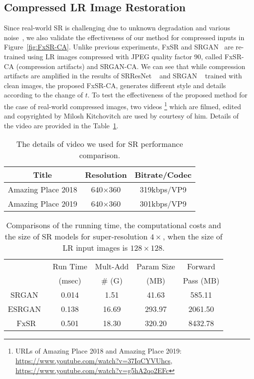 \documentclass{article}
\begin{document}
\subsection{Compressed LR Image Restoration}
Since real-world SR is challenging due to unknown degradation and various noise~\cite{zhang2020ntire, lugmayr2020ntire, nah2019ntire, hussein2020correction, ahn2020simusr, fritsche2019frequency, zhang2018learning, lugmayr2019unsupervised}, we also validate the effectiveness of our method for compressed inputs in Figure~\ref{fig:FxSR-CA}. Unlike previous experiments, FxSR and SRGAN~\cite{2017photo} are re-trained using LR images compressed with JPEG quality factor 90, called FxSR-CA (compression artifacts) and SRGAN-CA. We can see that while compression artifacts are amplified in the results of SRResNet ~\cite{2017photo} and SRGAN ~\cite{2017photo} trained with clean images, the proposed FxSR-CA, generates different style and details according to the change of $t$. To test the effectiveness of the proposed method for the case of real-world compressed images, two videos \footnote{URLs of Amazing Place 2018 and Amazing Place 2019: \url{https://www.youtube.com/watch?v=37IqCYVUhcs}, \url{https://www.youtube.com/watch?v=g5hA2qo2EFc}} which are filmed, edited and copyrighted by Milosh Kitchovitch are used by courtesy of him. Details of the video are provided in the Table~\ref{tab:comp_video}.



\begin{table}[ht]
\caption{The details of video we used for SR performance comparison.}
\begin{center}
\small
\begin{tabular}{|c|c|c|}
\hline
Title & Resolution & Bitrate/Codec \\
\hline\hline
Amazing Place 2018    & 640$\times$360	&  319kbps/VP9 \\ 
\hline
Amazing Place 2019    & 640$\times$360	&  301kbps/VP9 \\ 
\hline
\end{tabular}
\end{center}
\label{tab:comp_video}
\end{table}

\begin{table}[ht]
\caption{Comparisons of the running time, the computational costs and the size of SR models for super-resolution $4\times$, when the size of LR input images is ${128}\times{128}$.}
\begin{center}
\begin{tabular}{|c||c|c|c|c|}
\hline
{}  & Run Time  & Mult-Add & Param Size &  Forward \\
{}  & (msec)  & $\#$ (G) & (MB) &  Pass (MB)\\
\hline
\hline
{SRGAN~\cite{2017photo}} & 0.014 & 1.51 & 41.63 & 585.11\\
{ESRGAN~\cite{2018esrgan}} & 0.138 & 16.69 & 293.97 & 2061.50\\
{FxSR} & 0.501 & 18.30 & 320.20 & 8432.78\\
\hline
\end{tabular}
\end{center}
\label{tab:tab_time_space}
\end{table}
\end{document}
